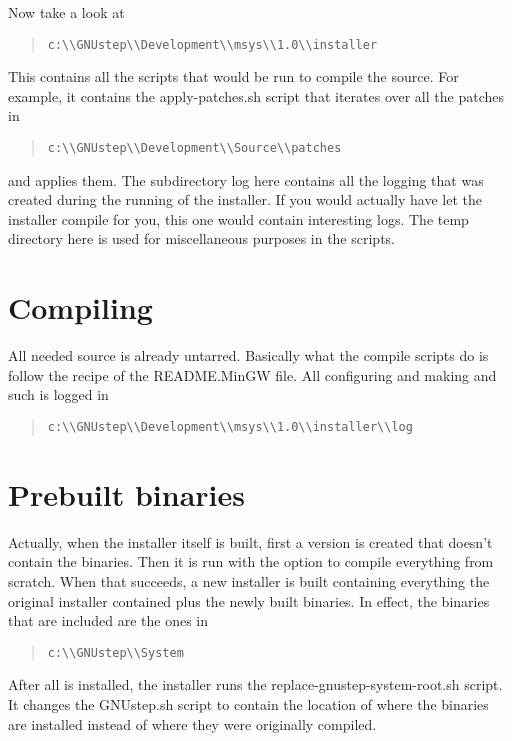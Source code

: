 \documentclass{article}
\begin{document}
Now take a look at \begin{quote}
\begin{verbatim}c:\\GNUstep\\Development\\msys\\1.0\\installer\end{verbatim}
\end{quote} This
contains all the scripts that would be run to compile the source. For
example, it contains the apply-patches.sh script that iterates over
all the patches in \begin{quote}
\begin{verbatim}c:\\GNUstep\\Development\\Source\\patches\end{verbatim}
\end{quote} and applies
them.
The subdirectory log here contains all the logging that was created during
the running of the installer. If you would actually have let the
installer compile for you, this one would contain interesting
logs. The temp directory here is used for miscellaneous purposes in
the scripts.


\section{Compiling}
All needed source is already untarred. Basically what the compile
scripts do is follow the recipe of the README.MinGW file. All
configuring and making and such is logged in
\begin{quote}
\begin{verbatim}c:\\GNUstep\\Development\\msys\\1.0\\installer\\log\end{verbatim}
\end{quote}


\section{Prebuilt binaries}
Actually, when the installer itself is built, first a version is
created that doesn't contain the binaries. Then it is run with the
option to compile everything from scratch. When that succeeds, a new
installer is built containing everything the original installer
contained plus the newly built binaries. In effect, the binaries that
are included are the ones in \begin{quote}
\begin{verbatim}c:\\GNUstep\\System\end{verbatim}
\end{quote}

After all is installed, the installer runs the
replace-gnustep-system-root.sh script. It changes the GNUstep.sh
script to contain the location of where the binaries are installed
instead of where they were originally compiled.
\end{document}
